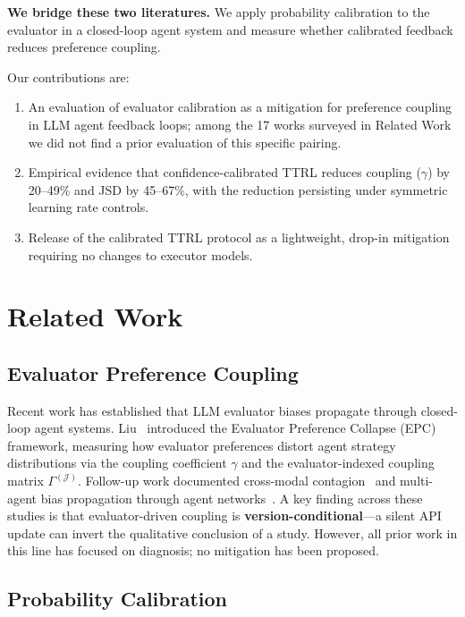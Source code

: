 \documentclass[11pt]{article}
\begin{document}
\textbf{We bridge these two literatures.} We apply probability calibration to the evaluator in a closed-loop agent system and measure whether calibrated feedback reduces preference coupling.

Our contributions are:
\begin{enumerate}[leftmargin=*,nosep]
 \item An evaluation of evaluator calibration as a mitigation for preference coupling in LLM agent feedback loops; among the 17 works surveyed in Related Work we did not find a prior evaluation of this specific pairing.
 \item Empirical evidence that confidence-calibrated TTRL reduces coupling ($\gamma$) by 20--49\% and JSD by 45--67\%, with the reduction persisting under symmetric learning rate controls.
 \item Release of the calibrated TTRL protocol as a lightweight, drop-in mitigation requiring no changes to executor models.
\end{enumerate}

\section{Related Work}

\subsection{Evaluator Preference Coupling}

Recent work has established that LLM evaluator biases propagate through closed-loop agent systems. Liu~\cite{liu2026epc} introduced the Evaluator Preference Collapse (EPC) framework, measuring how evaluator preferences distort agent strategy distributions via the coupling coefficient $\gamma$ and the evaluator-indexed coupling matrix $\Gamma^{(\mathcal{J})}$. Follow-up work documented cross-modal contagion~\cite{liu2026mmepc} and multi-agent bias propagation through agent networks~\cite{liu2026contagion}. A key finding across these studies is that evaluator-driven coupling is \textbf{version-conditional}---a silent API update can invert the qualitative conclusion of a study. However, all prior work in this line has focused on diagnosis; no mitigation has been proposed.

\subsection{Probability Calibration}
\end{document}
